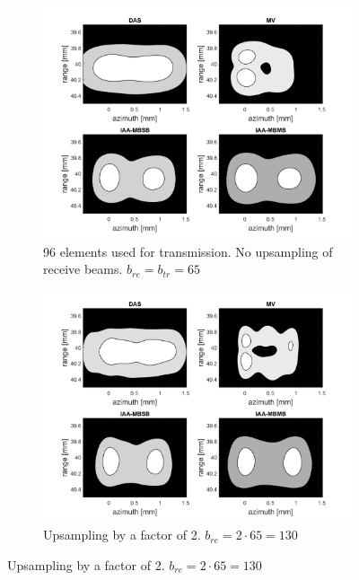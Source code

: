 \iffalse

\begin{figure}[ht]
    \centering
    \begin{subfigure}[t]{0.48\linewidth}
        \includegraphics[width=\linewidth]{./images/discussion/all-standard.png}
        \caption{96 elements used for transmission. No upsampling of receive beams. $b_{re} = b_{tr} = 65$}
    \end{subfigure}
    \quad
    \begin{subfigure}[t]{0.48\linewidth}
        \includegraphics[width=\linewidth]{./images/discussion/all-time2.png}
        \caption{Upsampling by a factor of 2. $b_{re} = 2 \cdot 65 = 130$}
    \end{subfigure}

\end{figure}
